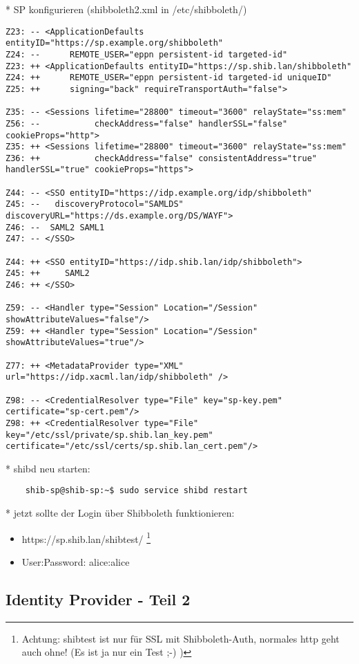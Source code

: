 * SP konfigurieren (shibboleth2.xml  in /etc/shibboleth/)
\begin{lstlisting}
Z23: -- <ApplicationDefaults entityID="https://sp.example.org/shibboleth"
Z24: --      REMOTE_USER="eppn persistent-id targeted-id"
Z23: ++ <ApplicationDefaults entityID="https://sp.shib.lan/shibboleth"
Z24: ++      REMOTE_USER="eppn persistent-id targeted-id uniqueID"
Z25: ++      signing="back" requireTransportAuth="false">

Z35: -- <Sessions lifetime="28800" timeout="3600" relayState="ss:mem"
Z56: --           checkAddress="false" handlerSSL="false" cookieProps="http">
Z35: ++ <Sessions lifetime="28800" timeout="3600" relayState="ss:mem"
Z36: ++           checkAddress="false" consistentAddress="true" handlerSSL="true" cookieProps="https">

Z44: -- <SSO entityID="https://idp.example.org/idp/shibboleth"
Z45: --   discoveryProtocol="SAMLDS" discoveryURL="https://ds.example.org/DS/WAYF">
Z46: --  SAML2 SAML1
Z47: -- </SSO>

Z44: ++ <SSO entityID="https://idp.shib.lan/idp/shibboleth">
Z45: ++ 	SAML2
Z46: ++ </SSO>

Z59: -- <Handler type="Session" Location="/Session" showAttributeValues="false"/>
Z59: ++ <Handler type="Session" Location="/Session" showAttributeValues="true"/>

Z77: ++ <MetadataProvider type="XML" url="https://idp.xacml.lan/idp/shibboleth" />

Z98: -- <CredentialResolver type="File" key="sp-key.pem" certificate="sp-cert.pem"/>
Z98: ++ <CredentialResolver type="File" key="/etc/ssl/private/sp.shib.lan_key.pem" certificate="/etc/ssl/certs/sp.shib.lan_cert.pem"/>
\end{lstlisting}

* shibd neu starten:
\begin{lstlisting}
	shib-sp@shib-sp:~$ sudo service shibd restart
\end{lstlisting}
* jetzt sollte der Login über Shibboleth funktionieren:
\begin{itemize}
\item https://sp.shib.lan/shibtest/ \footnote{Achtung: shibtest ist nur für SSL mit Shibboleth-Auth, normales http geht auch ohne! (Es ist ja nur ein Test ;-) )}
\item User:Password: alice:alice
\end{itemize}

\subsection{Identity Provider - Teil 2}
